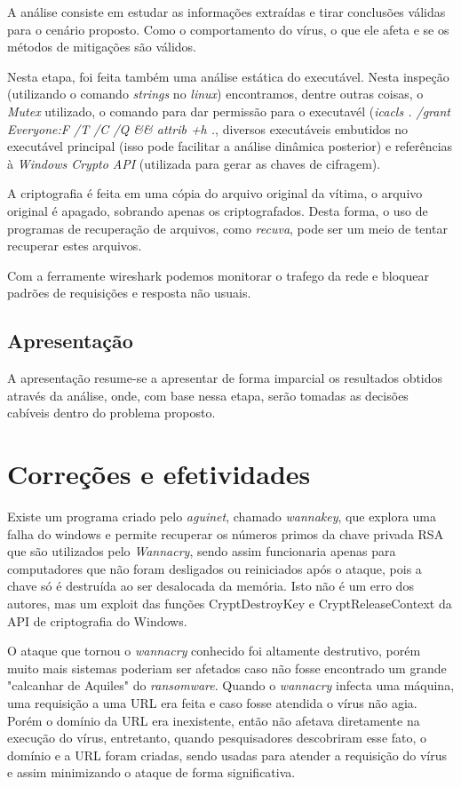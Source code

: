 \documentclass[12pt]{article}
\begin{document}
A análise consiste em estudar as informações extraídas e tirar conclusões válidas para o cenário proposto. Como o comportamento do vírus, o que ele afeta e se os métodos de mitigações são válidos.

Nesta etapa, foi feita também uma análise estática do executável. Nesta inspeção (utilizando o comando \textit{strings} no \textit{linux}) encontramos, dentre outras coisas, o \textit{Mutex} utilizado, o comando para dar permissão para o executavél (\textit{icacls . /grant Everyone:F /T /C /Q \&\& attrib +h .}, diversos executáveis embutidos no executável principal (isso pode facilitar a análise dinâmica posterior) e referências à \textit{Windows Crypto API} (utilizada para gerar as chaves de cifragem). 

A criptografia é feita em uma cópia do arquivo original da vítima, o arquivo original é apagado, sobrando apenas os criptografados. Desta forma, o uso de programas de recuperação de arquivos, como \textit{recuva}, pode ser um meio de tentar recuperar estes arquivos.

Com a ferramente wireshark podemos monitorar o trafego da rede e bloquear padrões de requisições e resposta não usuais.

\subsection{Apresentação}

A apresentação resume-se a apresentar de forma imparcial os resultados obtidos através da análise, onde, com base nessa etapa, serão tomadas as decisões cabíveis dentro do problema proposto.

\section{Correções e efetividades}

Existe um programa criado pelo \textit{aguinet}, chamado \textit{wannakey}, que explora uma falha do windows e permite recuperar os números primos da chave privada RSA que são utilizados pelo \textit{Wannacry}, sendo assim funcionaria apenas para computadores que não foram desligados ou reiniciados após o ataque, pois a chave só é destruída ao ser desalocada da memória. Isto não é um erro dos autores, mas um exploit das funções CryptDestroyKey e CryptReleaseContext da API de criptografia do Windows.

O ataque que tornou o \textit{wannacry} conhecido foi altamente destrutivo, porém muito mais sistemas poderiam ser afetados caso não fosse encontrado um grande "calcanhar de Aquiles" do \textit{ransomware}. Quando o \textit{wannacry} infecta uma máquina, uma requisição a uma URL era feita e caso fosse atendida o vírus não agia. Porém o domínio da URL era inexistente, então não afetava diretamente na execução do vírus, entretanto, quando pesquisadores descobriram esse fato, o domínio e a URL foram criadas, sendo usadas para atender a requisição do vírus e assim minimizando o ataque de forma significativa.
\end{document}
